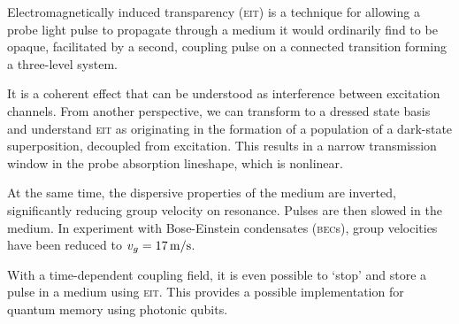     Electromagnetically induced transparency (\textsc{eit}) is a technique for
    allowing a probe light pulse to propagate through a medium it would
    ordinarily find to be opaque, facilitated by a second, coupling pulse on a
    connected transition forming a three-level system.\cite{Fleischhauer2005,Harris1997,Harris1990}

    It is a coherent effect that can be understood as interference between
    excitation channels. From another perspective, we can transform to a
    dressed state basis and understand \textsc{eit} as originating in the
    formation of a population of a dark-state superposition, decoupled from
    excitation. This results in a narrow transmission window in the probe
    absorption lineshape, which is nonlinear.

    At the same time, the dispersive properties of the medium are inverted,
    significantly reducing group velocity on resonance. Pulses are then slowed
    in the medium. In experiment with Bose-Einstein condensates (\textsc{bec}s),
    group velocities have been reduced to $v_g = \unit[17]{m/s}$.\cite{Hau1999}

    With a time-dependent coupling field, it is even possible to `stop' and
    store  a pulse in a medium using \textsc{eit}. This provides a possible
    implementation for quantum memory using photonic qubits.\cite{Lvovsky2009}

  

  